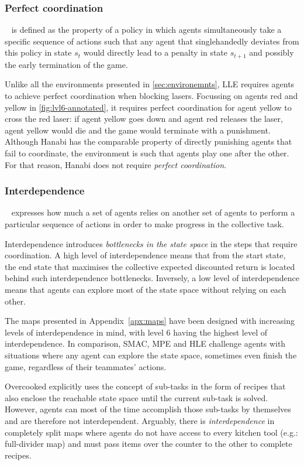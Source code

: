 \subsubsection{Perfect coordination}~
is defined as the property of a policy in which agents simultaneously take a specific sequence of actions such that any agent that singlehandedly deviates from this policy in state $s_t$ would directly lead to a penalty in state $s_{t+1}$ and possibly the early termination of the game.

Unlike all the environments presented in \autoref{sec:environemnts}, LLE requires agents to achieve perfect coordination when blocking lasers. Focussing on agents red and yellow in \autoref{fig:lvl6-annotated}, it requires perfect coordination for agent yellow to cross the red laser: if agent yellow goes down and agent red releases the laser, agent yellow would die and the game would terminate with a punishment.
Although Hanabi has the comparable property of directly punishing agents that fail to coordinate, the environment is such that agents play one after the other. For that reason, Hanabi does not require \textit{perfect coordination}.


\subsubsection{Interdependence} \label{sec:prop-interdependence}~ 
expresses how much a set of agents relies on another set of agents to perform a particular sequence of actions in order to make progress in the collective task.

Interdependence introduces \emph{bottlenecks in the state space} in the steps that require coordination. A high level of interdependence means that from the start state, the end state that maximises the collective expected discounted return is located behind such interdependence bottlenecks. Inversely, a low level of interdependence means that agents can explore most of the state space without relying on each other.

The maps presented in Appendix~\ref{apx:maps} have been designed with increasing levels of interdependence in mind, with level 6 having the highest level of interdependence. In comparison, SMAC, MPE and HLE challenge agents with situations where any agent can explore the state space, sometimes even finish the game, regardless of their teammates' actions.

Overcooked explicitly uses the concept of sub-tasks in the form of recipes that also enclose the reachable state space until the current sub-task is solved. However, agents can most of the time accomplish those sub-tasks by themselves and are therefore not interdependent. Arguably, there is \textit{interdependence} in completely split maps where agents do not have access to every kitchen tool (e.g.: full-divider map) and must pass items over the counter to the other to complete recipes.



